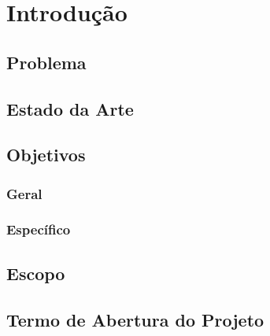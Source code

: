 \chapter[Introdução]{Introdução}

	\section[Problema]{Problema}
	
	\section[Estado da Arte]{Estado da Arte}
	
	\section[Objetivos]{Objetivos}
		\subsection[Geral]{Geral}
		\subsection[Específico]{Específico}
	
	\section[Escopo]{Escopo}

	\section[Termo de Abertura do Projeto]{Termo de Abertura do Projeto}
